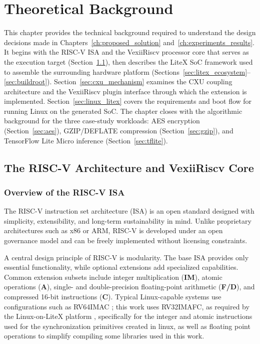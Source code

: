\chapter{Theoretical Background}
\label{ch:theoretical_background}

This chapter provides the technical background required to understand the design decisions
made in Chapters~\ref{ch:proposed_solution} and~\ref{ch:experiments_results}.
It begins with the RISC-V ISA and the VexiiRiscv processor core that serves as the
execution target (Section~\ref{sec:riscv_vexii}), then describes the LiteX SoC framework
used to assemble the surrounding hardware platform
(Sections~\ref{sec:litex_ecosystem}--\ref{sec:buildroot}).
Section~\ref{sec:cxu_mechanism} examines the CXU coupling architecture and the
VexiiRiscv plugin interface through which the extension is implemented.
Section~\ref{sec:linux_litex} covers the requirements and boot flow for running Linux on
the generated SoC.
The chapter closes with the algorithmic background for the three case-study workloads:
AES encryption (Section~\ref{sec:aes}), GZIP/DEFLATE compression
(Section~\ref{sec:gzip}), and TensorFlow Lite Micro inference
(Section~\ref{sec:tflite}).

\section{The RISC-V Architecture and VexiiRiscv Core}
\label{sec:riscv_vexii}

\subsection{Overview of the RISC-V ISA}
\label{subsec:riscv_isa}

The RISC-V instruction set architecture (ISA) \cite{RISC-VInternational2025} is an open
standard designed with simplicity, extensibility, and long-term sustainability in mind.
Unlike proprietary architectures such as x86 or ARM, RISC-V is developed under an
open governance model and can be freely implemented without licensing constraints.

A central design principle of RISC-V is modularity.
The base ISA provides only essential functionality, while optional extensions add
specialized capabilities.
Common extension subsets include integer multiplication (\textbf{IM}),
atomic operations (\textbf{A}),
single- and double-precision floating-point arithmetic (\textbf{F/D}),
and compressed 16-bit instructions (\textbf{C}).
Typical Linux-capable systems use configurations such as RV64IMAC \cite{Rakhmatov2023Survey};
this work uses RV32IMAFC, as required by the Linux-on-LiteX platform
\cite{LinuxOnLiteXGitHub}, specifically for the integer and atomic instructions
used for the synchronization primitives created in linux, as well as
floating point operations to simplify compiling some libraries used in this work.


